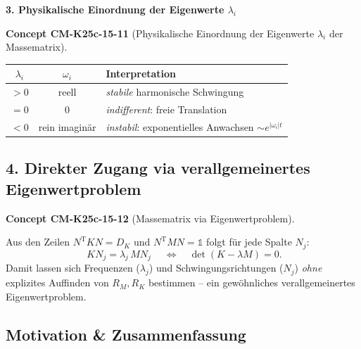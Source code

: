 \documentclass[10pt, letterpaper]{article}
\newcommand{\CustomHeading}[3]{%
  \par\medskip\noindent%
  \textbf{#1 #2} \textnormal{(#3)}.\enskip%
}
\newenvironment{CONC}[2]{\begin{unitbox}\CustomHeading{Concept}{#1}{#2}}{\end{unitbox}}
\begin{document}
\textbf{3. Physikalische Einordnung der Eigenwerte \(\lambda_i\)}


\begin{CONC}{CM-K25c-15-11}{Physikalische Einordnung der Eigenwerte $\lambda_i$ der Massematrix}
\centering
  \begin{tabular}{ccl}
    \toprule
    $\lambda_i$ & $\omega_i$ & Interpretation \\
    \midrule
    $>0$ & reell & \textit{stabile} harmonische Schwingung \\
    $=0$ & $0$   & \textit{indifferent}: freie Translation \\
    $<0$ & rein imaginär &
      \makecell[l]{\textit{instabil}: exponentielles\\
                   Anwachsen $\sim e^{|\omega_i|t}$} \\
    \bottomrule
  \end{tabular}
\end{CONC}




\subsection*{4. Direkter Zugang via verallgemeinertes Eigenwertproblem}

\begin{CONC}{CM-K25c-15-12}{Massematrix via Eigenwertproblem}
Aus den Zeilen
\(N^{\mathrm T}KN=D_K\) und
\(N^{\mathrm T}MN=\mathbb{1}\)
folgt für jede Spalte \(N_j\):
\[
   \boxed{\;KN_j=\lambda_j\,MN_j\;}
   \quad\Longleftrightarrow\quad
   \det(K-\lambda M)=0 .
\]
Damit lassen sich Frequenzen (\(\lambda_j\)) und
Schwingungsrichtungen (\(N_j\)) \emph{ohne} explizites Auffinden von
\(R_M,R_K\) bestimmen – ein gewöhnliches
verallgemeinertes Eigenwertproblem.
\end{CONC}

\subsection*{Motivation \& Zusammenfassung}
\end{document}
